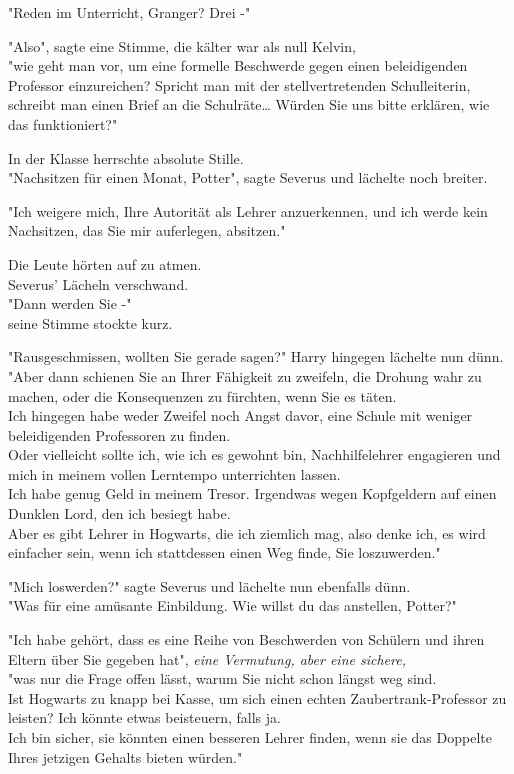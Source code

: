 {"Reden im Unterricht, Granger? Drei -"

"Also", sagte eine Stimme, die kälter war als null Kelvin,\\ "wie geht man vor, um eine formelle Beschwerde gegen einen beleidigenden Professor einzureichen? Spricht man mit der stellvertretenden Schulleiterin, schreibt man einen Brief an die Schulräte… Würden Sie uns bitte erklären, wie das funktioniert?"

In der Klasse herrschte absolute Stille.\\ "Nachsitzen für einen Monat, Potter", sagte Severus und lächelte noch breiter.

"Ich weigere mich, Ihre Autorität als Lehrer anzuerkennen, und ich werde kein Nachsitzen, das Sie mir auferlegen, absitzen."

Die Leute hörten auf zu atmen.\\ Severus' Lächeln verschwand.\\ "Dann werden Sie -"\\ seine Stimme stockte kurz.

"Rausgeschmissen, wollten Sie gerade sagen?" Harry hingegen lächelte nun dünn.\\ "Aber dann schienen Sie an Ihrer Fähigkeit zu zweifeln, die Drohung wahr zu machen, oder die Konsequenzen zu fürchten, wenn Sie es täten.\\ Ich hingegen habe weder Zweifel noch Angst davor, eine Schule mit weniger beleidigenden Professoren zu finden.\\ Oder vielleicht sollte ich, wie ich es gewohnt bin, Nachhilfelehrer engagieren und mich in meinem vollen Lerntempo unterrichten lassen.\\ Ich habe genug Geld in meinem Tresor. Irgendwas wegen Kopfgeldern auf einen Dunklen Lord, den ich besiegt habe.\\ Aber es gibt Lehrer in Hogwarts, die ich ziemlich mag, also denke ich, es wird einfacher sein, wenn ich stattdessen einen Weg finde, Sie loszuwerden."

"Mich loswerden?" sagte Severus und lächelte nun ebenfalls dünn.\\ "Was für eine amüsante Einbildung. Wie willst du das anstellen, Potter?"

"Ich habe gehört, dass es eine Reihe von Beschwerden von Schülern und ihren Eltern über Sie gegeben hat", \emph{eine Vermutung, aber eine sichere,}\\ "was nur die Frage offen lässt, warum Sie nicht schon längst weg sind.\\ Ist Hogwarts zu knapp bei Kasse, um sich einen echten Zaubertrank-Professor zu leisten? Ich könnte etwas beisteuern, falls ja.\\ Ich bin sicher, sie könnten einen besseren Lehrer finden, wenn sie das Doppelte Ihres jetzigen Gehalts bieten würden."

}
